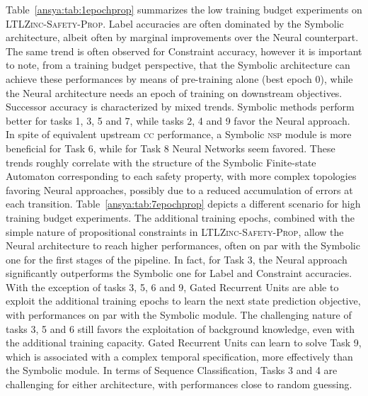 Table~\ref{ansya:tab:1epochprop} summarizes the low training budget experiments on \textsc{LTLZinc-Safety-Prop}. 
Label accuracies are often dominated by the Symbolic architecture, albeit often by marginal improvements over the Neural counterpart. The same trend is often observed for Constraint accuracy, however it is important to note, from a training budget perspective, that the Symbolic architecture can achieve these performances by means of pre-training alone (best epoch 0), while the Neural architecture needs an epoch of training on downstream objectives.
Successor accuracy is characterized by mixed trends. Symbolic methods perform better for tasks 1, 3, 5 and 7, while tasks 2, 4 and 9 favor the Neural approach. 
In spite of equivalent upstream \textsc{cc} performance, a Symbolic \textsc{nsp} module is more beneficial for Task 6, while for Task 8 Neural Networks seem favored. These trends roughly correlate with the structure of the Symbolic Finite-state Automaton corresponding to each safety property, with more complex topologies favoring Neural approaches, possibly due to a reduced accumulation of errors at each transition.
%
Table~\ref{ansya:tab:7epochprop} depicts a different scenario for high training budget experiments. The additional training epochs, combined with the simple nature of propositional constraints in \textsc{LTLZinc-Safety-Prop}, allow the Neural architecture to reach higher performances, often on par with the Symbolic one for the first stages of the pipeline. In fact, for Task 3, the Neural approach significantly outperforms the Symbolic one for Label and Constraint accuracies.
With the exception of tasks 3, 5, 6 and 9, Gated Recurrent Units are able to exploit the additional training epochs to learn the next state prediction objective, with performances on par with the Symbolic module.
The challenging nature of tasks 3, 5 and 6 still favors the exploitation of background knowledge, even with the additional training capacity. Gated Recurrent Units can learn to solve Task 9, which is associated with a complex temporal specification, more effectively than the Symbolic module.
In terms of Sequence Classification, Tasks 3 and 4 are challenging for either architecture, with performances close to random guessing.

